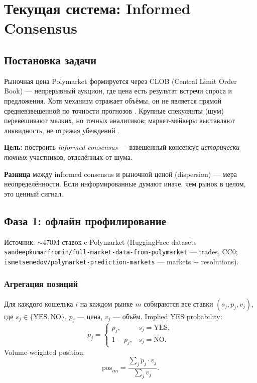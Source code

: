 \section{Текущая система: Informed Consensus}
\label{sec:current}

\subsection{Постановка задачи}

Рыночная цена Polymarket формируется через CLOB (Central Limit Order Book) ---
непрерывный аукцион, где цена есть результат встречи спроса и предложения.
Хотя механизм отражает объёмы, он не является прямой средневзвешенной
по точности прогнозов \citep{wolfers2004prediction}.
Крупные спекулянты (шум) перевешивают мелких, но точных аналитиков;
маркет-мейкеры выставляют ликвидность, не отражая убеждений
\citep{manski2006interpreting}.

\textbf{Цель:} построить \emph{informed consensus} --- взвешенный консенсус
\emph{исторически точных} участников, отделённых от шума.

\textbf{Разница} между informed consensus и рыночной ценой (dispersion) ---
мера неопределённости.
Если информированные думают иначе, чем рынок в целом, это ценный сигнал.

\subsection{Фаза 1: офлайн профилирование}

Источник: ${\sim}470$M ставок c Polymarket (HuggingFace datasets
\texttt{sandeepkumarfromin/full-market-data-from-polymarket} --- trades, CC0;
\texttt{ismetsemedov/polymarket-prediction-markets} --- markets + resolutions).

\subsubsection{Агрегация позиций}

Для каждого кошелька $i$ на каждом рынке $m$ собираются все ставки
$(s_j, p_j, v_j)$, где $s_j \in \{\text{YES}, \text{NO}\}$,
$p_j$ --- цена, $v_j$ --- объём.
Implied YES probability:
\[
\tilde{p}_j = \begin{cases} p_j, & s_j = \text{YES}, \\ 1 - p_j, & s_j = \text{NO}. \end{cases}
\]
Volume-weighted position:
\begin{equation}
\label{eq:position}
\mathrm{pos}_{im} = \frac{\sum_j \tilde{p}_j \cdot v_j}{\sum_j v_j}.
\end{equation}

